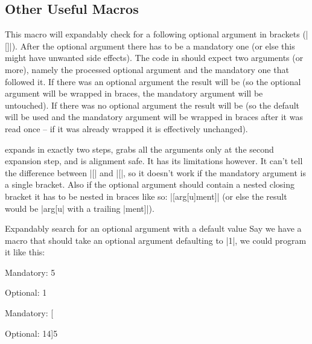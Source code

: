 \subsection{Other Useful Macros}

\begin{function}{\ekvoptarg}
  \begin{syntax}
  \end{syntax}
  This macro will expandably check for a following optional argument in brackets
  (|[]|). After the optional argument there has to be a mandatory one (or else
  this might have unwanted side effects). The code in  should expect
  two arguments (or more), namely the processed optional argument and the
  mandatory one that followed it. If there was an optional argument the result
  will be  (so the optional argument
  will be wrapped in braces, the mandatory argument will be untouched). If there
  was no optional argument the result will be
   (so the default will be used and the
  mandatory argument will be wrapped in braces after it was read once -- if it
  was already wrapped it is effectively unchanged).

   expands in exactly two steps, grabs all the arguments only at
  the second expansion step, and is alignment safe. It has its limitations
  however. It can't tell the difference between |[| and |{[}|, so it doesn't
  work if the mandatory argument is a single bracket. Also if the optional
  argument should contain a nested closing bracket it has to be nested in braces
  like so: |[{arg[u]ment}]| (or else the result would be |arg[u| with a trailing
  |ment]|).
\end{function}
\begin{example}{Expandably search for an optional argument with a default value}
  Say we have a macro that should take an optional argument defaulting to |1|,
  we could program it like this:
  \makeatletter
  \begin{enverb}
    \newcommand\foo{\ekvoptarg\@foo{1}}
    \newcommand\@foo[2]{Mandatory: #2\par Optional: #1}
    \foo{5}\par
    \foo[4]{5}\par
  \end{enverb}
\end{example}

